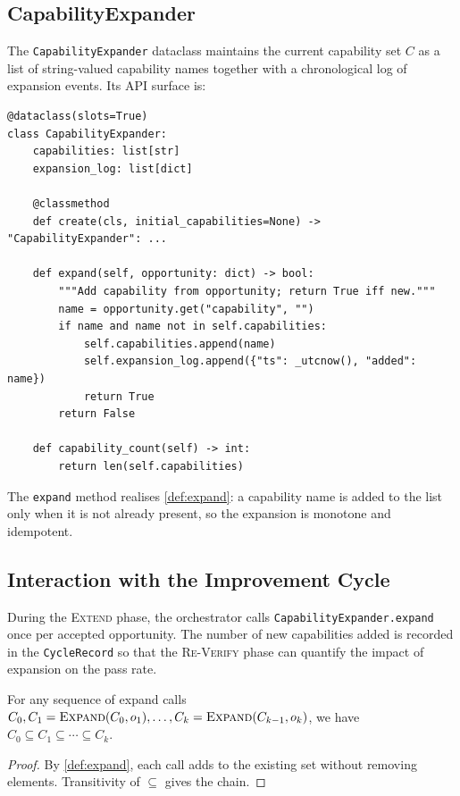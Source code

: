 \documentclass[11pt]{article}
\newcommand{\Extend}{\textsc{Extend}}
\newcommand{\ReVerify}{\textsc{Re-Verify}}
\newcommand{\Expand}{\textsc{Expand}}
\begin{document}
\subsection{CapabilityExpander}

The \texttt{CapabilityExpander} dataclass maintains the current capability
set $C$ as a list of string-valued capability names together with a
chronological log of expansion events.  Its API surface is:

\begin{lstlisting}[style=jugeo-python, caption={CapabilityExpander interface.}]
@dataclass(slots=True)
class CapabilityExpander:
    capabilities: list[str]
    expansion_log: list[dict]

    @classmethod
    def create(cls, initial_capabilities=None) -> "CapabilityExpander": ...

    def expand(self, opportunity: dict) -> bool:
        """Add capability from opportunity; return True iff new."""
        name = opportunity.get("capability", "")
        if name and name not in self.capabilities:
            self.capabilities.append(name)
            self.expansion_log.append({"ts": _utcnow(), "added": name})
            return True
        return False

    def capability_count(self) -> int:
        return len(self.capabilities)
\end{lstlisting}

The \texttt{expand} method realises \cref{def:expand}: a capability name is
added to the list only when it is not already present, so the expansion is
monotone and idempotent.

\subsection{Interaction with the Improvement Cycle}

During the \Extend{} phase, the orchestrator calls
\texttt{CapabilityExpander.expand} once per accepted opportunity.  The number
of new capabilities added is recorded in the \texttt{CycleRecord} so that
the \ReVerify{} phase can quantify the impact of expansion on the pass rate.

\begin{proposition}\label{prop:expand}
For any sequence of expand calls
$C_0, C_1 = \Expand(C_0, o_1), \ldots, C_k = \Expand(C_{k-1}, o_k)$,
we have $C_0 \subseteq C_1 \subseteq \cdots \subseteq C_k$.
\end{proposition}
\begin{proof}
By \cref{def:expand}, each call adds to the existing set without removing
elements.  Transitivity of $\subseteq$ gives the chain.
\end{proof}
\end{document}
